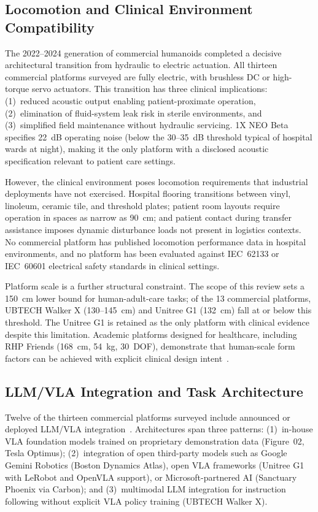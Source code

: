 \documentclass[acmjour]{acmart}
\begin{document}
\subsection{Locomotion and Clinical Environment Compatibility}
\label{sec:locomotion}

The 2022--2024 generation of commercial humanoids completed a decisive architectural
transition from hydraulic to electric actuation. All thirteen commercial platforms
surveyed are fully electric, with brushless DC or high-torque servo actuators.
This transition has three clinical implications: (1)~reduced acoustic output
enabling patient-proximate operation, (2)~elimination of fluid-system leak risk
in sterile environments, and (3)~simplified field maintenance without hydraulic
servicing. 1X NEO Beta specifies 22~dB operating noise (below the 30--35~dB
threshold typical of hospital wards at night), making it the only platform with
a disclosed acoustic specification relevant to patient care settings.

However, the clinical environment poses locomotion requirements that industrial
deployments have not exercised. Hospital flooring transitions between vinyl,
linoleum, ceramic tile, and threshold plates; patient room layouts require
operation in spaces as narrow as 90~cm; and patient contact during transfer
assistance imposes dynamic disturbance loads not present in logistics contexts.
No commercial platform has published locomotion performance data in hospital
environments, and no platform has been evaluated against IEC~62133 or IEC~60601
electrical safety standards in clinical settings.

Platform scale is a further structural constraint. The scope of this review sets
a 150~cm lower bound for human-adult-care tasks; of the 13 commercial platforms,
UBTECH Walker X (130--145~cm) and Unitree G1 (132~cm) fall at or below this
threshold. The Unitree G1 is retained as the only platform with clinical evidence
despite this limitation. Academic platforms designed for healthcare, including
RHP Friends (168~cm, 54~kg, 30~DOF), demonstrate that human-scale form factors
can be achieved with explicit clinical design intent~\cite{benallegue2025rhp}.

\subsection{LLM/VLA Integration and Task Architecture}
\label{sec:llmvla}

Twelve of the thirteen commercial platforms surveyed include announced or
deployed LLM/VLA integration~\cite{cao2025humanoid}. Architectures span three
patterns: (1)~in-house VLA foundation models trained on proprietary demonstration
data (Figure~02, Tesla Optimus); (2)~integration of open third-party models such
as Google Gemini Robotics (Boston Dynamics Atlas), open VLA frameworks
(Unitree G1 with LeRobot and OpenVLA support), or Microsoft-partnered AI
(Sanctuary Phoenix via Carbon); and (3)~multimodal LLM integration for
instruction following without explicit VLA policy training (UBTECH Walker X).
\end{document}
